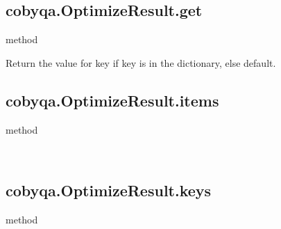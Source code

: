 \documentclass[letterpaper,10pt,english]{sphinxmanual}
\begin{document}
\begin{fulllineitems}
\subsection{cobyqa.OptimizeResult.get}
\label{\detokenize{refs/generated/cobyqa.OptimizeResult.get:cobyqa-optimizeresult-get}}\label{\detokenize{refs/generated/cobyqa.OptimizeResult.get::doc}}
\sphinxAtStartPar
method

\begin{fulllineitems}
\label{\detokenize{refs/generated/cobyqa.OptimizeResult.get:cobyqa.OptimizeResult.get}}
\sphinxAtStartPar
Return the value for key if key is in the dictionary, else default.

\end{fulllineitems}



\subsection{cobyqa.OptimizeResult.items}
\label{\detokenize{refs/generated/cobyqa.OptimizeResult.items:cobyqa-optimizeresult-items}}\label{\detokenize{refs/generated/cobyqa.OptimizeResult.items::doc}}
\sphinxAtStartPar
method

\begin{fulllineitems}
\label{\detokenize{refs/generated/cobyqa.OptimizeResult.items:cobyqa.OptimizeResult.items}}~
\end{fulllineitems}



\subsection{cobyqa.OptimizeResult.keys}
\label{\detokenize{refs/generated/cobyqa.OptimizeResult.keys:cobyqa-optimizeresult-keys}}\label{\detokenize{refs/generated/cobyqa.OptimizeResult.keys::doc}}
\sphinxAtStartPar
method


\end{fulllineitems}
\end{document}
